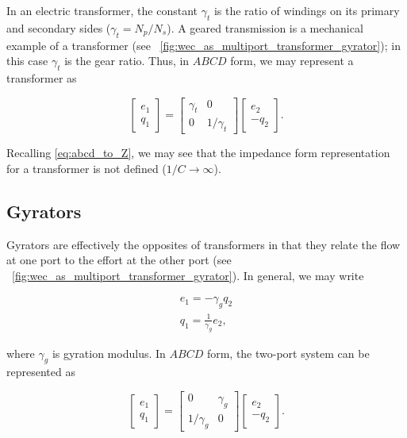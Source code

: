\documentclass[lettersize,journal]{IEEEtran}
\begin{document}
In an electric transformer, the constant $\gamma_t$ is the ratio of windings on its primary and secondary sides ($\gamma_t=N_p/N_s$).
A geared transmission is a mechanical example of a transformer (see \figurename~\ref{fig:wec_as_multiport_transformer_gyrator}); in this case $\gamma_{t}$ is the gear ratio.
Thus, in $ABCD$ form, we may represent a transformer as

\begin{equation}
        \begin{bmatrix}
                e_1 \\ q_1
        \end{bmatrix}
        =
        \begin{bmatrix}
                \gamma_{t} & 0 \\ 0 & 1/\gamma_{t}
        \end{bmatrix}
        \begin{bmatrix}
                e_2 \\ - q_2
        \end{bmatrix} .
        \label{eq:transformer_abcd}
\end{equation}

\noindent{}Recalling \eqref{eq:abcd_to_Z}, we may see that the impedance form representation for a transformer is not defined ($1/C \rightarrow \infty$).

\subsection{Gyrators}\label{sec:gyrators}
Gyrators are effectively the opposites of transformers in that they relate the flow at one port to the effort at the other port (see \figurename~\ref{fig:wec_as_multiport_transformer_gyrator}).
In general, we may write

\begin{subequations}
        \begin{align}
               e_1 = - \gamma_g q_2 \\
               q_1 = \frac{1}{\gamma_g} e_2 ,
        \end{align}
        \label{eq:gyrator_eom}
\end{subequations}

\noindent{}where $\gamma_g$ is gyration modulus.
In $ABCD$ form, the two-port system can be represented as

\begin{equation}
        \begin{bmatrix}
                e_1 \\ q_1
        \end{bmatrix}
        =
        \begin{bmatrix}
                0 & \gamma_g \\ 1/\gamma_g & 0
        \end{bmatrix}
        \begin{bmatrix}
                e_2 \\ - q_2
        \end{bmatrix} .
        \label{eq:gyrator_abcd}
\end{equation}
\end{document}
